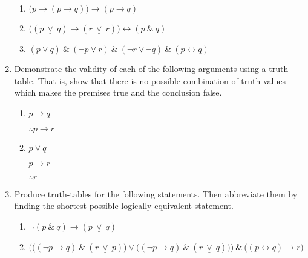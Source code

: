 \documentclass{article}
\begin{document}
\begin{enumerate}
\begin{enumerate}
\item $\bigl(p\rightarrow (p\rightarrow q)\bigr)\rightarrow (p\rightarrow q)$

\item $\bigl( (p\ \underline\vee\  q)\rightarrow (r\ \underline\vee\  r)\bigr)
\leftrightarrow (p\ \&\ q)$

\item $(p\vee q)\ \&\ (\neg p \vee r)\ \&\ (\neg r\vee\neg q)\ \&\ (p\leftrightarrow
q)$

\end{enumerate}
\item Demonstrate the validity of each of the following arguments using a 
truth-table. That is, show that there is no possible combination of truth-values
which makes the premises true and the conclusion false.

\begin{enumerate}
\item 
$p\rightarrow q$


$\therefore p\rightarrow r$

\bigskip

\item
$p\vee q$

$p \rightarrow r$


$\therefore r$

\bigskip

\end{enumerate}

\item Produce truth-tables for the following statements. Then abbreviate them by 
finding the shortest possible logically equivalent statement.
\begin{enumerate}
\item $\neg (p \ \&\ q)\rightarrow (p\ \underline\vee \ q)$
\item $\bigl( \bigl( (\neg p\rightarrow q)\ \&\ (r\ \underline\vee \ p)\bigr) \vee 
\bigl( ( \neg p \rightarrow q)\ \&\ (r\ \underline\vee \ q)\bigr) \bigr) \ \&\ 
\bigl((p\leftrightarrow q)\rightarrow r\bigr)$
\end{enumerate}


\end{enumerate}
\end{document}
